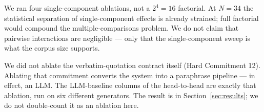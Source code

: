 We ran four single-component ablations, not a $2^4 = 16$ factorial.
At $N=34$ the statistical separation of single-component effects
is already strained; full factorial would compound the
multiple-comparisons problem. We do not claim that pairwise
interactions are negligible --- only that the single-component
sweep is what the corpus size supports.

We did not ablate the verbatim-quotation contract itself
(Hard Commitment 12). Ablating that commitment converts the
system into a paraphrase pipeline --- in effect, an LLM. The
LLM-baseline columns of the head-to-head are exactly that
ablation, run on six different generators. The result is in
Section~\ref{sec:results}; we do not double-count it as an
ablation here.

